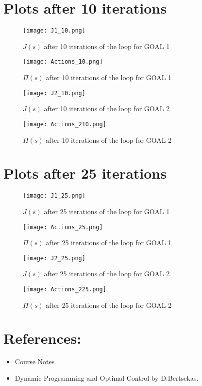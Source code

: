 \documentclass{article}
\begin{document}
\section{Plots after 10 iterations}
\begin{figure}[h]
 \centering
\texttt{[image: J1\_10.png]}
\caption{$J(s)$ after 10 iterations of the loop for GOAL 1}
\end{figure}

\begin{figure}[h]
 \centering
\texttt{[image: Actions\_10.png]}
\caption{$\Pi(s)$ after 10 iterations of the loop for GOAL 1}
\end{figure}

\begin{figure}[h]
 \centering
\texttt{[image: J2\_10.png]}
\caption{$J(s)$ after 10 iterations of the loop for GOAL 2}
\end{figure}

\begin{figure}[h]
 \centering
\texttt{[image: Actions\_210.png]}
\caption{$\Pi(s)$ after 10 iterations of the loop for GOAL 2}
\end{figure}


\section{Plots after 25 iterations}
\begin{figure}[h]
 \centering
\texttt{[image: J1\_25.png]}
\caption{$J(s)$ after 25 iterations of the loop for GOAL 1}
\end{figure}

\begin{figure}[h]
 \centering
\texttt{[image: Actions\_25.png]}
\caption{$\Pi(s)$ after 25 iterations of the loop for GOAL 1}
\end{figure}

\begin{figure}[h]
 \centering
\texttt{[image: J2\_25.png]}
\caption{$J(s)$ after 25 iterations of the loop for GOAL 2}
\end{figure}

\begin{figure}[h]
 \centering
\texttt{[image: Actions\_225.png]}
\caption{$\Pi(s)$ after 25 iterations of the loop for GOAL 2}
\end{figure}
\section{References:}
\begin{itemize}
\item Course Notes
\item Dynamic Programming and Optimal Control by D.Bertsekas.
\end{itemize}
\end{document}

